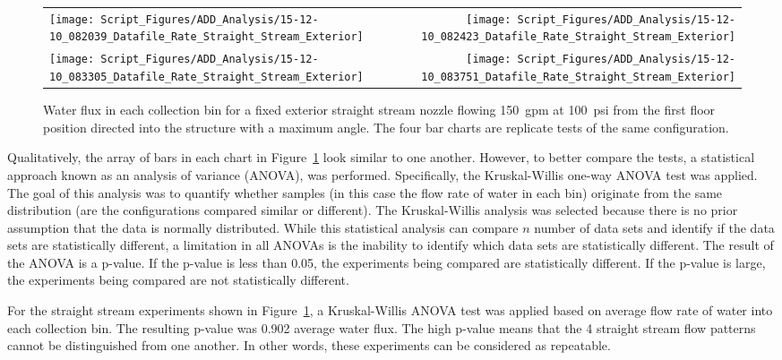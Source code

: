 \documentclass[12pt,oneside]{book}
\begin{document}
\begin{figure}[ht]
\begin{tabular*}{\textwidth}{lr}
\texttt{[image: Script\_Figures/ADD\_Analysis/15-12-10\_082039\_Datafile\_Rate\_Straight\_Stream\_Exterior]} &
\texttt{[image: Script\_Figures/ADD\_Analysis/15-12-10\_082423\_Datafile\_Rate\_Straight\_Stream\_Exterior]} \\
\texttt{[image: Script\_Figures/ADD\_Analysis/15-12-10\_083305\_Datafile\_Rate\_Straight\_Stream\_Exterior]} &
\texttt{[image: Script\_Figures/ADD\_Analysis/15-12-10\_083751\_Datafile\_Rate\_Straight\_Stream\_Exterior]} \\
\end{tabular*}
\caption[Water Flux for Straight Stream Exterior at Max Angle]{Water flux in each collection bin for a fixed exterior straight stream nozzle flowing 150~gpm at 100~psi from the first floor position directed into the structure with a maximum angle. The four bar charts are replicate tests of the same configuration.}
\label{fig:Repeatability_Testing}
\end{figure}

Qualitatively, the array of bars in each chart in Figure~\ref{fig:Repeatability_Testing} look similar to one another. However, to better compare the tests, a statistical approach known as an analysis of variance (ANOVA), was performed. Specifically, the Kruskal-Willis one-way ANOVA test was applied. The goal of this analysis was to quantify whether samples (in this case the flow rate of water in each bin) originate from the same distribution (are the configurations compared similar or different). The Kruskal-Willis analysis was selected because there is no prior assumption that the data is normally distributed. While this statistical analysis can compare $n$ number of data sets and identify if the data sets are statistically different, a limitation in all ANOVAs is the inability to identify which data sets are statistically different. The result of the ANOVA is a p-value. If the p-value is less than 0.05, the experiments being compared are statistically different. If the p-value is large, the experiments being compared are not statistically different.

For the straight stream experiments shown in Figure~\ref{fig:Repeatability_Testing}, a Kruskal-Willis ANOVA test was applied based on average flow rate of water into each collection bin. The resulting p-value was 0.902 average water flux. The high p-value means that the 4 straight stream flow patterns cannot be distinguished from one another. In other words, these experiments can be considered as repeatable.
\end{document}
